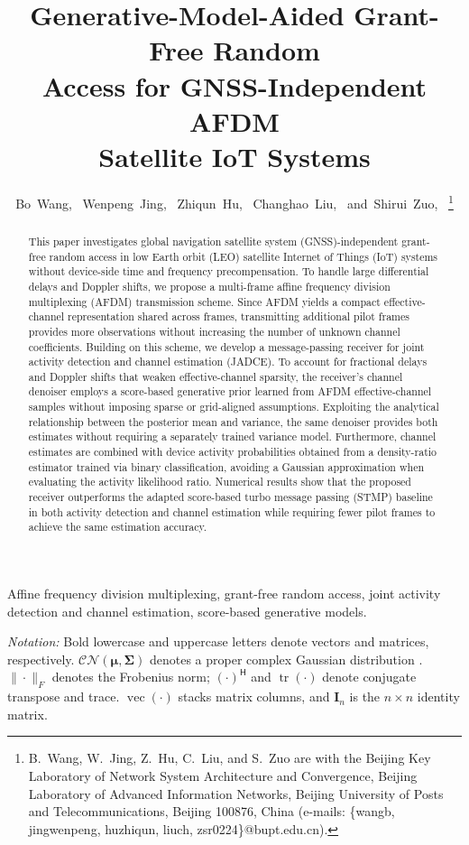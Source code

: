 \documentclass[10pt,journal,letterpaper]{IEEEtran}
\title{Generative-Model-Aided Grant-Free Random\\
Access for GNSS-Independent AFDM\\
Satellite IoT Systems}
\author{Bo~Wang,~\IEEEmembership{Student~Member,~IEEE,}
Wenpeng~Jing,~\IEEEmembership{Member,~IEEE,}
Zhiqun~Hu,~\IEEEmembership{Member,~IEEE,}
Changhao~Liu,~\IEEEmembership{Student~Member,~IEEE,}
and~Shirui~Zuo,~\IEEEmembership{Student~Member,~IEEE}%
\thanks{B.~Wang, W.~Jing, Z.~Hu, C.~Liu, and S.~Zuo are with the
Beijing Key Laboratory of Network System Architecture and Convergence,
Beijing Laboratory of Advanced Information Networks, Beijing University of
Posts and Telecommunications, Beijing 100876, China (e-mails:
\{wangb, jingwenpeng, huzhiqun, liuch, zsr0224\}@bupt.edu.cn).}}
\newcounter{algorithm}
\newcommand{\CN}{\mathcal{CN}}
\newcommand{\I}{\mathbf{I}}
\newcommand{\vect}{\operatorname{vec}}
\newcommand{\tr}{\operatorname{tr}}
\begin{document}
\maketitle
\begin{abstract}
This paper investigates global navigation satellite system (GNSS)-independent
grant-free random access in low Earth orbit (LEO) satellite Internet of Things
(IoT) systems without device-side time and frequency precompensation. To
handle large differential delays and Doppler shifts, we propose a multi-frame
affine frequency division multiplexing (AFDM) transmission scheme. Since AFDM
yields a compact effective-channel representation shared across frames,
transmitting additional pilot frames provides more observations without
increasing the number of unknown channel coefficients. Building on this
scheme, we develop a message-passing receiver for joint activity detection
and channel estimation (JADCE). To account for fractional delays and Doppler
shifts that weaken effective-channel sparsity, the receiver's channel denoiser
employs a score-based generative prior learned from AFDM effective-channel
samples without imposing sparse or grid-aligned assumptions. Exploiting the
analytical relationship between the posterior mean and variance, the same
denoiser provides both estimates without requiring a separately trained
variance model. Furthermore, channel estimates are combined with device
activity probabilities obtained from a density-ratio estimator trained via
binary classification, avoiding a Gaussian approximation when evaluating the
activity likelihood ratio. Numerical results show that the proposed receiver outperforms the
adapted score-based turbo message passing (STMP) baseline in both activity
detection and channel estimation while requiring fewer pilot frames to achieve
the same estimation accuracy.
\end{abstract}
\begin{IEEEkeywords}
Affine frequency division multiplexing, grant-free
random access, joint activity detection and channel estimation,
score-based generative models.
\end{IEEEkeywords}



\textit{Notation:} Bold lowercase and uppercase letters denote vectors and matrices, respectively. $\CN(\bm\mu,\bm\Sigma)$ denotes a proper complex Gaussian distribution \cite{neeser1993}.
$\|\cdot\|_F$ denotes the Frobenius norm;
$(\cdot)^{\mathsf H}$ and $\tr(\cdot)$ denote conjugate transpose and trace.
$\vect(\cdot)$ stacks matrix columns, and $\I_n$ is the $n\times n$ identity matrix.








\ifdefined\FullManuscript
\appendices
{}


\fi



\end{document}
